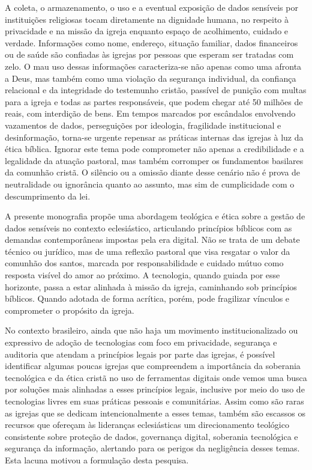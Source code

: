 A coleta, o armazenamento, o uso e a eventual exposição de dados sensíveis por instituições religiosas tocam diretamente na dignidade humana, no respeito à privacidade e na missão da igreja enquanto espaço de acolhimento, cuidado e verdade. Informações como nome, endereço, situação familiar, dados financeiros ou de saúde são confiadas às igrejas por pessoas que esperam ser tratadas com zelo. O mau uso dessas informações caracteriza-se não apenas como uma afronta a Deus, mas também como uma violação da segurança individual, da confiança relacional e da integridade do testemunho cristão, passível de punição com multas para a igreja e todas as partes responsáveis, que podem chegar até 50 milhões de reais, com interdição de bens. Em tempos marcados por escândalos envolvendo vazamentos de dados, perseguições por ideologia, fragilidade institucional e desinformação, torna-se urgente repensar as práticas internas das igrejas à luz da ética bíblica. Ignorar este tema pode comprometer não apenas a credibilidade e a legalidade da atuação pastoral, mas também corromper os fundamentos basilares da comunhão cristã. O silêncio ou a omissão diante desse cenário não é prova de neutralidade ou ignorância quanto ao assunto, mas sim de cumplicidade com o descumprimento da lei.

A presente monografia propõe uma abordagem teológica e ética sobre a gestão de dados sensíveis no contexto eclesiástico, articulando princípios bíblicos com as demandas contemporâneas impostas pela era digital. Não se trata de um debate técnico ou jurídico, mas de uma reflexão pastoral que visa resgatar o valor da comunhão dos santos, marcada por responsabilidade e cuidado mútuo como resposta visível do amor ao próximo. A tecnologia, quando guiada por esse horizonte, passa a estar alinhada à missão da igreja, caminhando sob princípios bíblicos. Quando adotada de forma acrítica, porém, pode fragilizar vínculos e comprometer o propósito da igreja.

No contexto brasileiro, ainda que não haja um movimento institucionalizado ou expressivo de adoção de tecnologias com foco em privacidade, segurança e auditoria que atendam a princípios legais por parte das igrejas, é possível identificar algumas poucas igrejas que compreendem a importância da soberania tecnológica e da ética cristã no uso de ferramentas digitais onde vemos uma busca por soluções mais alinhadas a esses princípios legais, inclusive por meio do uso de tecnologias livres em suas práticas pessoais e comunitárias. Assim como são raras as igrejas que se dedicam intencionalmente a esses temas, também são escassos os recursos que ofereçam às lideranças eclesiásticas um direcionamento teológico consistente sobre proteção de dados, governança digital, soberania tecnológica e segurança da informação, alertando para os perigos da negligência desses temas. Esta lacuna motivou a formulação desta pesquisa.

